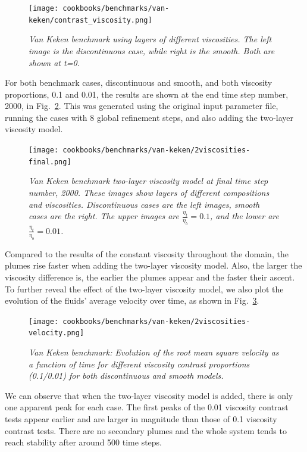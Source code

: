 \documentclass{article}
\begin{document}
\begin{figure}
        \centering
        \texttt{[image: cookbooks/benchmarks/van-keken/contrast\_viscosity.png]}
        \caption{\it Van Keken benchmark using layers of different viscosities. The left image is the discontinuous case, while right is the smooth.  Both are shown at t=0.}
        \label{fig:vk-7}
\end{figure}

For both benchmark cases, discontinuous and smooth, and both viscosity proportions, 0.1 and 0.01, the results are shown at the end time step number, 2000, in Fig.~\ref{fig:vk-8}.  This was generated using the original input parameter file, running the cases with 8 global refinement steps, and also adding the two-layer viscosity model.

\begin{figure}
        \centering
        \texttt{[image: cookbooks/benchmarks/van-keken/2viscosities-final.png]}
        \caption{\it Van Keken benchmark two-layer viscosity model at final time step number, 2000. These images show layers of different compositions and viscosities. Discontinuous cases are the left images, smooth cases are the right. The upper images are $\frac{\eta_{t}}{\eta_{b}}=0.1$, and the lower are $\frac{\eta_{t}}{\eta_{b}}=0.01$.}
        \label{fig:vk-8}
\end{figure}

Compared to the results of the constant viscosity throughout the domain, the plumes rise faster when adding the two-layer viscosity model. Also, the larger the viscosity difference is, the earlier the plumes appear and the faster their ascent. To further reveal the effect of the two-layer viscosity model, we also plot the evolution of the fluids' average velocity over time, as shown in Fig.~\ref{fig:vk-9}.

\begin{figure}
        \centering
        \texttt{[image: cookbooks/benchmarks/van-keken/2viscosities-velocity.png]}
        \caption{\it Van Keken benchmark: Evolution of the root mean square velocity as a function of time for different viscosity contrast proportions (0.1/0.01) for both discontinuous and smooth models.}
        \label{fig:vk-9}
\end{figure}

We can observe that when the two-layer viscosity model is added, there is only one apparent peak for each case. The first peaks of the 0.01 viscosity contrast tests appear earlier and are larger in magnitude than those of 0.1 viscosity contrast tests.  There are no secondary plumes and the whole system tends to reach stability after around 500 time steps.
\end{document}
